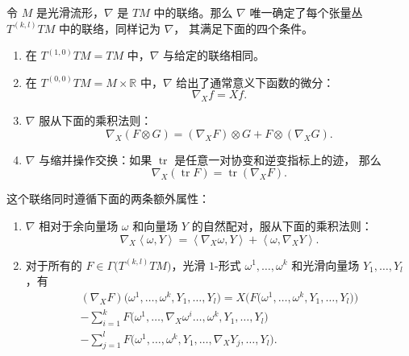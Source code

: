 \documentclass[fontset=none]{Notes}
\DeclareMathOperator\tr{tr}
\newcommand{\inn}[1]{\left\langle #1\right\rangle}
\begin{document}
\begin{proposition}
  令 $M$ 是光滑流形，$\nabla$ 是 $TM$ 中的联络。那么 $\nabla$
  唯一确定了每个张量丛 $T^{(k,l)}TM$ 中的联络，同样记为 $\nabla$，
  其满足下面的四个条件。
  \begin{enumerate}
    \item 在 $T^{(1,0)}TM=TM$ 中，$\nabla$ 与给定的联络相同。
    \item 在 $T^{(0,0)}TM=M\times \mathbb{R}$ 中，$\nabla$ 给出了通常意义下函数的微分：
    \[
      \nabla_Xf=Xf.  
    \]
    \item $\nabla$ 服从下面的乘积法则：
    \[
      \nabla_X(F\otimes G)=(\nabla_XF)\otimes G+F\otimes(\nabla_XG).  
    \]
    \item $\nabla$ 与缩并操作交换：如果 $\tr$ 是任意一对协变和逆变指标上的迹，
    那么
    \[
      \nabla_X(\tr F)=\tr(\nabla_XF).  
    \]
  \end{enumerate}
  这个联络同时遵循下面的两条额外属性：
  \begin{enumerate}[label=(\alph{*})]
    \item $\nabla$ 相对于余向量场 $\omega$ 和向量场 $Y$ 的自然配对，服从下面的乘积法则：
    \[
      \nabla_X\inn{\omega,Y}=\inn{\nabla_X\omega,Y}+\inn{\omega,\nabla_XY}.  
    \]
    \item 对于所有的 $F\in\Gamma\bigl(T^{(k,l)}TM\bigr)$，光滑 $1$-形式
    $\omega^1,\dots,\omega^k$ 和光滑向量场 $Y_1,\dots,Y_l$，有
    \begin{equation}\label{eq:convariant derivative of tensor field}
      \begin{gathered}
        (\nabla_XF)\bigl(\omega^1,\dots,\omega^k,Y_1,\dots,Y_l\bigr)=
        X\bigl(F\bigl(\omega^1,\dots,\omega^k,Y_1,\dots,Y_l\bigr)\bigr)\\
        -\sum_{i=1}^kF\bigl(\omega^1,\dots,\nabla_X\omega^i\dots,\omega^k,Y_1,\dots,Y_l\bigr)\\
        -\sum_{j=1}^lF\bigl(\omega^1,\dots,\omega^k,Y_1,\dots,\nabla_XY_j,\dots,Y_l\bigr).
      \end{gathered}
    \end{equation}
  \end{enumerate}
\end{proposition}
\end{document}
